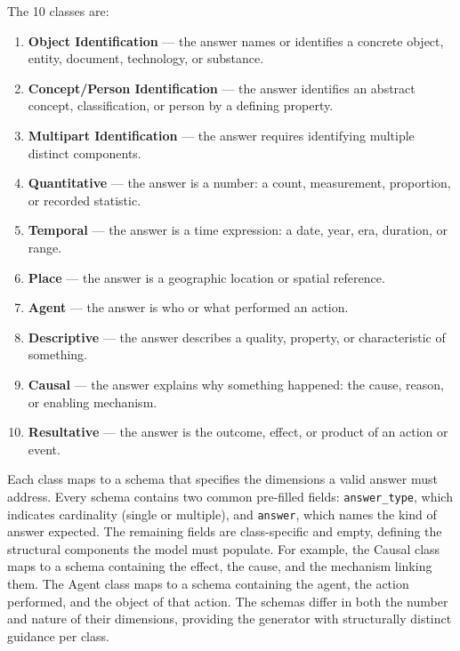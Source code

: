 \documentclass{article}
\begin{document}
The 10 classes are:

\begin{enumerate}
  \item \textbf{Object Identification} --- the answer names or identifies a concrete object, entity, document, technology, or substance.
  \item \textbf{Concept/Person Identification} --- the answer identifies an abstract concept, classification, or person by a defining property.
  \item \textbf{Multipart Identification} --- the answer requires identifying multiple distinct components.
  \item \textbf{Quantitative} --- the answer is a number: a count, measurement, proportion, or recorded statistic.
  \item \textbf{Temporal} --- the answer is a time expression: a date, year, era, duration, or range.
  \item \textbf{Place} --- the answer is a geographic location or spatial reference.
  \item \textbf{Agent} --- the answer is who or what performed an action.
  \item \textbf{Descriptive} --- the answer describes a quality, property, or characteristic of something.
  \item \textbf{Causal} --- the answer explains why something happened: the cause, reason, or enabling mechanism.
  \item \textbf{Resultative} --- the answer is the outcome, effect, or product of an action or event.
\end{enumerate}

Each class maps to a schema that specifies the dimensions a valid answer must address. Every schema contains two common pre-filled fields: \texttt{answer\_type}, which indicates cardinality (single or multiple), and \texttt{answer}, which names the kind of answer expected. The remaining fields are class-specific and empty, defining the structural components the model must populate. For example, the Causal class maps to a schema containing the effect, the cause, and the mechanism linking them. The Agent class maps to a schema containing the agent, the action performed, and the object of that action. The schemas differ in both the number and nature of their dimensions, providing the generator with structurally distinct guidance per class.
\end{document}
